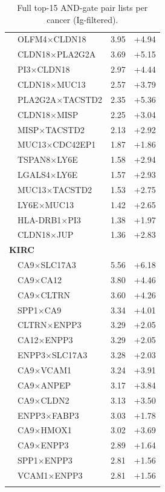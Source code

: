 \begin{longtable}{llrr}
 & OLFM4$\times$CLDN18 & 3.95 & +4.94\\
 & CLDN18$\times$PLA2G2A & 3.69 & +5.15\\
 & PI3$\times$CLDN18 & 2.97 & +4.44\\
 & CLDN18$\times$MUC13 & 2.57 & +3.79\\
 & PLA2G2A$\times$TACSTD2 & 2.35 & +5.36\\
 & CLDN18$\times$MISP & 2.25 & +3.04\\
 & MISP$\times$TACSTD2 & 2.13 & +2.92\\
 & MUC13$\times$CDC42EP1 & 1.87 & +1.86\\
 & TSPAN8$\times$LY6E & 1.58 & +2.94\\
 & LGALS4$\times$LY6E & 1.57 & +2.93\\
 & MUC13$\times$TACSTD2 & 1.53 & +2.75\\
 & LY6E$\times$MUC13 & 1.42 & +2.65\\
 & HLA-DRB1$\times$PI3 & 1.38 & +1.97\\
 & CLDN18$\times$JUP & 1.36 & +2.83\\
\multicolumn{4}{l}{\textbf{KIRC}}\\\hline
 & CA9$\times$SLC17A3 & 5.56 & +6.18\\
 & CA9$\times$CA12 & 3.80 & +4.46\\
 & CA9$\times$CLTRN & 3.60 & +4.26\\
 & SPP1$\times$CA9 & 3.34 & +4.01\\
 & CLTRN$\times$ENPP3 & 3.29 & +2.05\\
 & CA12$\times$ENPP3 & 3.29 & +2.05\\
 & ENPP3$\times$SLC17A3 & 3.28 & +2.03\\
 & CA9$\times$VCAM1 & 3.24 & +3.91\\
 & CA9$\times$ANPEP & 3.17 & +3.84\\
 & CA9$\times$CLDN2 & 3.13 & +3.50\\
 & ENPP3$\times$FABP3 & 3.03 & +1.78\\
 & CA9$\times$HMOX1 & 3.02 & +3.69\\
 & CA9$\times$ENPP3 & 2.89 & +1.64\\
 & SPP1$\times$ENPP3 & 2.81 & +1.56\\
 & VCAM1$\times$ENPP3 & 2.81 & +1.56\\
\hline\hline\caption{Full top-15 AND-gate pair lists per cancer (Ig-filtered).}\label{tab:andgatefull}\end{longtable}
